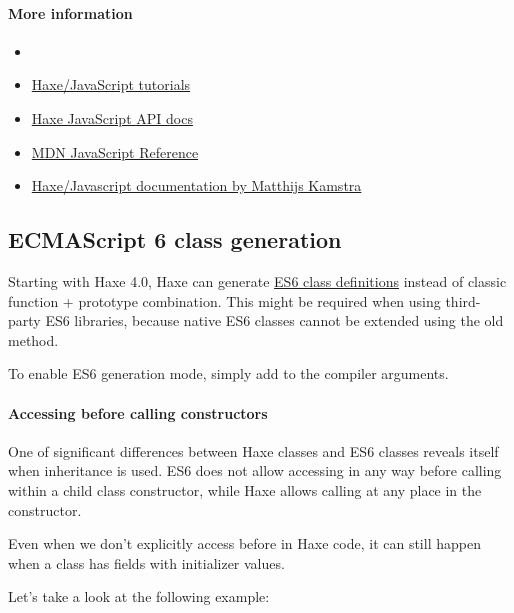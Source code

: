 \paragraph{More information}

\begin{itemize}
	\item {}
	\item \href{https://code.haxe.org/category/javascript/}{Haxe/JavaScript tutorials}
	\item \href{https://api.haxe.org/js/}{Haxe JavaScript API docs}
	\item \href{https://developer.mozilla.org/bm/docs/Web/JavaScript}{MDN JavaScript Reference}
	\item \href{https://matthijskamstra.github.io/haxejs/}{Haxe/Javascript documentation by Matthijs Kamstra}
\end{itemize}

\subsection{ECMAScript 6 class generation}
\label{target-javascript-es6}


Starting with Haxe 4.0, Haxe can generate \href{https://developer.mozilla.org/en-US/docs/Web/JavaScript/Reference/Classes}{ES6 class definitions} instead of classic function + prototype combination. This might be required when using third-party ES6 libraries, because native ES6 classes cannot be extended using the old method.

To enable ES6 generation mode, simply add  to the compiler arguments.

\paragraph{Accessing  before calling  constructors}

One of significant differences between Haxe classes and ES6 classes reveals itself when inheritance is used. ES6 does not allow accessing  in any way before calling  within a child class constructor, while Haxe allows calling  at any place in the constructor.

Even when we don't explicitly access  before  in Haxe code, it can still happen when a class has fields with initializer values.

Let's take a look at the following example:

